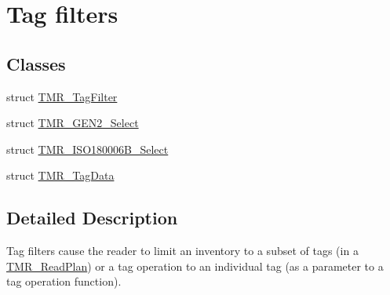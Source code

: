 \hypertarget{group__filter}{
\section{Tag filters}
\label{group__filter}
}
\subsection*{Classes}
\begin{CompactItemize}
\item 
struct \hyperlink{struct_t_m_r___tag_filter}{TMR\_\-TagFilter}
\item 
struct \hyperlink{struct_t_m_r___g_e_n2___select}{TMR\_\-GEN2\_\-Select}
\item 
struct \hyperlink{struct_t_m_r___i_s_o180006_b___select}{TMR\_\-ISO180006B\_\-Select}
\item 
struct \hyperlink{struct_t_m_r___tag_data}{TMR\_\-TagData}
\end{CompactItemize}


\subsection{Detailed Description}
Tag filters cause the reader to limit an inventory to a subset of tags (in a \hyperlink{struct_t_m_r___read_plan}{TMR\_\-ReadPlan}) or a tag operation to an individual tag (as a parameter to a tag operation function). 